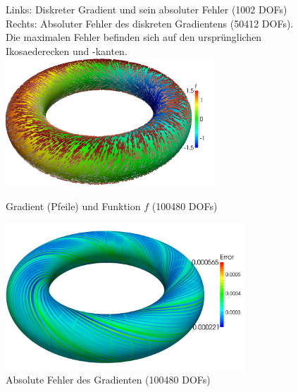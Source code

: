 \begin{figure}
              {Links: Diskreter Gradient und sein absoluter Fehler (1002 DOFs)
               Rechts: Absoluter Fehler des diskreten Gradientens (50412 DOFs).
                       Die maximalen Fehler befinden sich auf den ursprünglichen Ikosaederecken und -kanten.}
      \label{figGradSphere}
      \centering\includegraphics[width=0.7\textwidth]{bilder/gradTorus/gradAndF_100k.png}
      \caption[Gradient auf Torus]{Gradient (Pfeile) und Funktion \( f \) (100480 DOFs)}
      \label{figGradTorus}
      \centering\includegraphics[width=0.8\textwidth]{bilder/gradTorus/Error_100k.png}
      \caption[Gradient auf Torus (Fehler)]{Absolute Fehler des Gradienten (100480 DOFs)}
      \label{figGradTorusError}
    \end{figure}


